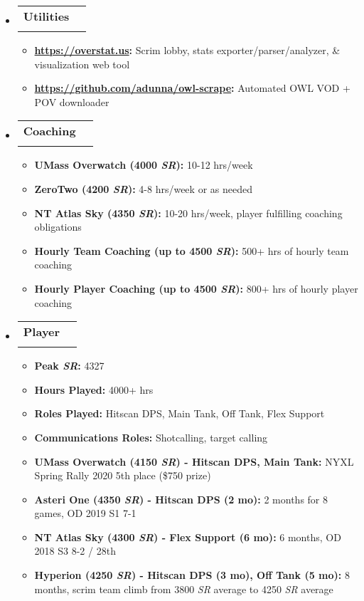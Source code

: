 \documentclass[letterpaper,11pt]{article}
\makeatletter
\newcommand{\resitem}[1]{\item #1 \vspace{-2pt}}
\newcommand{\ressubheading}[4]{
\begin{tabular*}{6.5in}{l@{\cftdotfill{\cftsecdotsep}\extracolsep{\fill}}r}
		\textbf{#1} & #2 \\
		\textit{#3} & \textit{#4} \\
\end{tabular*}\vspace{-6pt}}
\makeatother
\begin{document}
\begin{itemize}

\item[]

\ressubheading{Utilities}{}{}{}

\begin{itemize}
  \resitem{\textbf{\href{https://overstat.us}{https://overstat.us}:} Scrim lobby, stats exporter/parser/analyzer, \& visualization web tool}
  \resitem{\textbf{\href{https://github.com/adunna/owl-scrape}{https://github.com/adunna/owl-scrape}:} Automated OWL VOD + POV downloader}
\end{itemize}

\item[]

\ressubheading{Coaching}{}{}{}

\begin{itemize}
  \resitem{\textbf{UMass Overwatch (4000 \textit{SR}):} 10-12 hrs/week}
  \resitem{\textbf{ZeroTwo (4200 \textit{SR}):} 4-8 hrs/week or as needed}
  \resitem{\textbf{NT Atlas Sky (4350 \textit{SR}):} 10-20 hrs/week, player fulfilling coaching obligations}
  \resitem{\textbf{Hourly Team Coaching (up to 4500 \textit{SR}):} 500+ hrs of hourly team coaching}
  \resitem{\textbf{Hourly Player Coaching (up to 4500 \textit{SR}):} 800+ hrs of hourly player coaching}
\end{itemize}

\newpage

\item[]

\ressubheading{Player}{}{}{}

\begin{itemize}
  \resitem{\textbf{Peak \textit{SR}:} 4327}
  \resitem{\textbf{Hours Played:} 4000+ hrs}
  \resitem{\textbf{Roles Played:} Hitscan DPS, Main Tank, Off Tank, Flex Support}
  \resitem{\textbf{Communications Roles:} Shotcalling, target calling}
  \resitem{\textbf{UMass Overwatch (4150 \textit{SR}) - Hitscan DPS, Main Tank:} NYXL Spring Rally 2020 5th place (\$750 prize)}
  \resitem{\textbf{Asteri One (4350 \textit{SR}) - Hitscan DPS (2 mo):} 2 months for 8 games, OD 2019 S1 7-1}
  \resitem{\textbf{NT Atlas Sky (4300 \textit{SR}) - Flex Support (6 mo):} 6 months, OD 2018 S3 8-2 / 28th}
  \resitem{\textbf{Hyperion (4250 \textit{SR}) - Hitscan DPS (3 mo), Off Tank (5 mo):} 8 months, scrim team climb from 3800 \textit{SR} average to 4250 \textit{SR} average}
\end{itemize}

\end{itemize}
\end{document}
